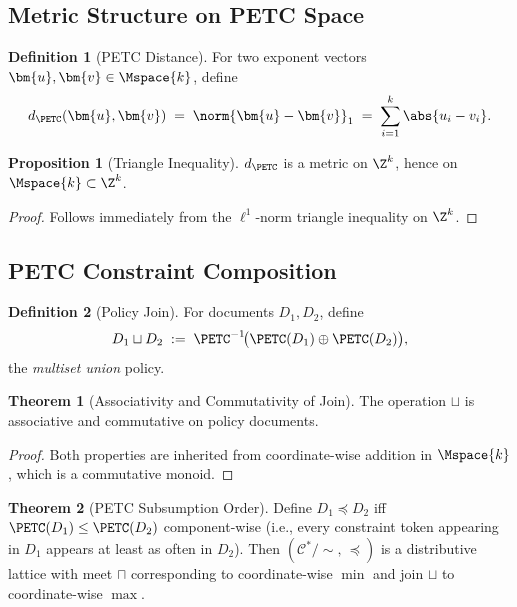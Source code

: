\documentclass[12pt,letterpaper]{article}
\theoremstyle{definition}
\newtheorem{definition}{Definition}[section]
\newtheorem{theorem}{Theorem}[section]
\newtheorem{proposition}{Proposition}[section]
\theoremstyle{remark}
\begin{document}
\subsection{Metric Structure on PETC Space}
\label{ssec:petc-metric}

\begin{definition}[PETC Distance]
  \label{def:petc-dist}
  For two exponent vectors \(\bm{u}, \bm{v} \in \Mspace{k}\), define
  \[
    d_{\PETC}(\bm{u}, \bm{v})
    \;=\; \norm{\bm{u} - \bm{v}}_1
    \;=\; \sum_{i=1}^{k} \abs{u_i - v_i}.
  \]
\end{definition}

\begin{proposition}[Triangle Inequality]
  \(d_{\PETC}\) is a metric on \(\Z^k\), hence on \(\Mspace{k} \subset \Z^k\).
\end{proposition}

\begin{proof}
  Follows immediately from the \(\ell^1\)-norm triangle inequality on \(\Z^k\).
\end{proof}

\subsection{PETC Constraint Composition}
\label{ssec:petc-compose}

\begin{definition}[Policy Join]
  \label{def:policy-join}
  For documents \(D_1, D_2\), define
  \[
    D_1 \sqcup D_2 \;:=\; \PETC^{-1}\!\bigl(\PETC(D_1) \oplus \PETC(D_2)\bigr),
  \]
  the \emph{multiset union} policy.
\end{definition}

\begin{theorem}[Associativity and Commutativity of Join]
  \label{thm:join-assoc}
  The operation \(\sqcup\) is associative and commutative on policy documents.
\end{theorem}

\begin{proof}
  Both properties are inherited from coordinate-wise addition in
  \(\Mspace{k}\), which is a commutative monoid.
\end{proof}

\begin{theorem}[PETC Subsumption Order]
  \label{thm:petc-subsumption}
  Define \(D_1 \preceq D_2\) iff \(\PETC(D_1) \le \PETC(D_2)\) component-wise
  (i.e., every constraint token appearing in \(D_1\) appears at least as
  often in \(D_2\)).  Then \((\mathcal{C}^*/{\sim},\, \preceq)\) is a
  distributive lattice with meet \(\sqcap\) corresponding to
  coordinate-wise \(\min\) and join \(\sqcup\) to coordinate-wise \(\max\).
\end{theorem}
\end{document}

